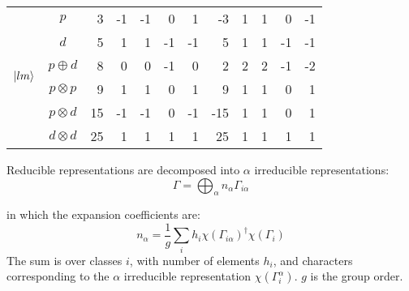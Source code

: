 \documentclass[preprint,showpacs,preprintnumbers,superscriptaddress,prb,floatfix,aps]{revtex4-1}
\begin{document}
\begin{table}
\begin{ruledtabular}
\begin{tabular*}{10cm}{lllrrrrrrrrrr}
\multirow{6}{*}{$\ket{lm}$}  & \multicolumn{2}{c}{$p$          } &  3  &     -1 &    -1  &     0  &     1  &  -3  &          1  &          1  &          0  &         -1  \\
  				         	 & \multicolumn{2}{c}{$d$          } &  5  &      1 &     1  &    -1  &    -1  &   5  &          1  &          1  &         -1  &         -1  \\
                             & \multicolumn{2}{c}{$p \oplus  d$} &  8  &      0 &     0  &    -1  &     0  &   2  &          2  &          2  &         -1  &         -2  \\
  				         	 & \multicolumn{2}{c}{$p \otimes p$} &  9  &      1 &     1  &     0  &     1  &   9  &          1  &          1  &          0  &          1  \\
  				         	 & \multicolumn{2}{c}{$p \otimes d$} & 15  &     -1 &    -1  &     0  &    -1  & -15  &          1  &          1  &          0  &          1  \\
  				         	 & \multicolumn{2}{c}{$d \otimes d$} & 25  &      1 &     1  &     1  &     1  &  25  &          1  &          1  &          1  &          1  \\
\end{tabular*}
\end{ruledtabular}
\end{table}

Reducible representations are decomposed into $\alpha$ irreducible representations:
\begin{equation}
\label{eq:irrep_decomposition}
\Gamma = \bigoplus_\alpha n_\alpha \Gamma_{i\alpha}
\end{equation}

in which the expansion coefficients are:
\begin{equation}
\label{eq:irrep_decomposition_coefficients}
n_\alpha = \frac{1}{g} \sum_i h_i \chi\left(\Gamma_{i\alpha}\right)^\dag \chi\left(\Gamma_i\right)
\end{equation}
The sum is over classes $i$, with number of elements $h_i$, and characters corresponding to the $\alpha$ irreducible representation $\chi(\Gamma_i^\alpha)$. $g$ is the group order.





%
%
%
\end{document}
